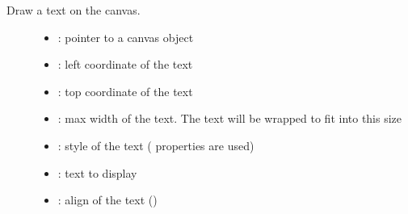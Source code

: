 \documentclass[letterpaper,10pt,english]{sphinxmanual}
\begin{document}
\begin{fulllineitems}
\label{\detokenize{object-types/canvas:_CPPv419lv_canvas_draw_textP8lv_obj_t10lv_coord_t10lv_coord_t10lv_coord_tPK10lv_style_tPKc16lv_label_align_t}}%
\pysigstartmultiline
{}\label{\detokenize{object-types/canvas:lv__canvas_8h_1a46846d683d523e533953526c85cf333e}}%
\pysigstopmultiline
Draw a text on the canvas. \begin{description}
\item[{}] \leavevmode\begin{itemize}
\item {} 
: pointer to a canvas object 

\item {} 
: left coordinate of the text 

\item {} 
: top coordinate of the text 

\item {} 
: max width of the text. The text will be wrapped to fit into this size 

\item {} 
: style of the text ( properties are used) 

\item {} 
: text to display 

\item {} 
: align of the text () 

\end{itemize}

\end{description}


\end{fulllineitems}

\end{document}
